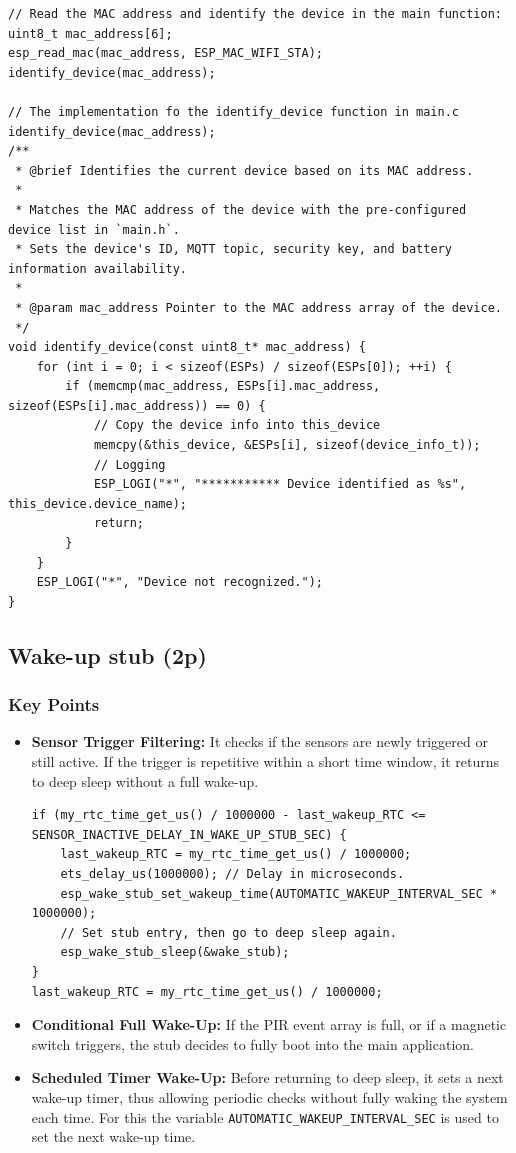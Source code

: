 \documentclass[A4,10pt]{article}
\begin{document}
\begin{itemize}
\begin{verbatim}
// Read the MAC address and identify the device in the main function:
uint8_t mac_address[6];
esp_read_mac(mac_address, ESP_MAC_WIFI_STA);
identify_device(mac_address);

// The implementation fo the identify_device function in main.c
identify_device(mac_address);
/**
 * @brief Identifies the current device based on its MAC address.
 *
 * Matches the MAC address of the device with the pre-configured device list in `main.h`.
 * Sets the device's ID, MQTT topic, security key, and battery information availability.
 *
 * @param mac_address Pointer to the MAC address array of the device.
 */
void identify_device(const uint8_t* mac_address) {
    for (int i = 0; i < sizeof(ESPs) / sizeof(ESPs[0]); ++i) {
        if (memcmp(mac_address, ESPs[i].mac_address, sizeof(ESPs[i].mac_address)) == 0) {
            // Copy the device info into this_device
            memcpy(&this_device, &ESPs[i], sizeof(device_info_t));
            // Logging
            ESP_LOGI("*", "*********** Device identified as %s", this_device.device_name);
            return;
        }
    }
    ESP_LOGI("*", "Device not recognized.");
}
    \end{verbatim}
    
\end{itemize}


\subsection{Wake-up stub (2p)}
\label{sec:wakeup_stub}

\subsubsection{Key Points}
\begin{itemize}
    \item \textbf{Sensor Trigger Filtering:} It checks if the sensors are newly triggered or still active. If the trigger is repetitive within a short time window, it returns to deep sleep without a full wake-up.
\begin{verbatim}
if (my_rtc_time_get_us() / 1000000 - last_wakeup_RTC <= SENSOR_INACTIVE_DELAY_IN_WAKE_UP_STUB_SEC) {
	last_wakeup_RTC = my_rtc_time_get_us() / 1000000;
	ets_delay_us(1000000); // Delay in microseconds.
	esp_wake_stub_set_wakeup_time(AUTOMATIC_WAKEUP_INTERVAL_SEC * 1000000);
	// Set stub entry, then go to deep sleep again.
	esp_wake_stub_sleep(&wake_stub);
}
last_wakeup_RTC = my_rtc_time_get_us() / 1000000;
\end{verbatim}
    \item \textbf{Conditional Full Wake-Up:} If the PIR event array is full, or if a magnetic switch triggers, the stub decides to fully boot into the main application.
    \item \textbf{Scheduled Timer Wake-Up:} Before returning to deep sleep, it sets a next wake-up timer, thus allowing periodic checks without fully waking the system each time. For this the variable \texttt{AUTOMATIC\_WAKEUP\_INTERVAL\_SEC} is used to set the next wake-up time.
\end{itemize}
\end{document}
